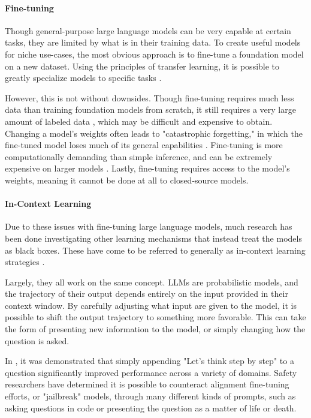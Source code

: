 \paragraph{Fine-tuning}

Though general-purpose large language models can be very capable at certain tasks, they are limited by what is in their training data. To create useful models for niche use-cases, the most obvious approach is to fine-tune a foundation model on a new dataset. Using the principles of transfer learning, it is possible to greatly specialize models to specific tasks \cite{dodge2020finetuningpretrainedlanguagemodels}.

However, this is not without downsides. Though fine-tuning requires much less data than training foundation models from scratch, it still requires a very large amount of labeled data \cite{vieira2024datadatafinetuninglarge}, which may be difficult and expensive to obtain. Changing a model's weights often leads to "catastrophic forgetting," in which the fine-tuned model loses much of its general capabilities \cite{catastrophic_forgetting}. Fine-tuning is more computationally demanding than simple inference, and can be extremely expensive on larger models \cite{hu2022lora}. Lastly, fine-tuning requires access to the model's weights, meaning it cannot be done at all to closed-source models.

\paragraph{In-Context Learning}

Due to these issues with fine-tuning large language models, much research has been done investigating other learning mechanisms that instead treat the models as black boxes. These have come to be referred to generally as in-context learning strategies \citep{dong-etal-2024-survey}.

Largely, they all work on the same concept. LLMs are probabilistic models, and the trajectory of their output depends entirely on the input provided in their context window. By carefully adjusting what input are given to the model, it is possible to shift the output trajectory to something more favorable. This can take the form of presenting new information to the model, or simply changing how the question is asked.

In \citet{ZeroShot}, it was demonstrated that simply appending "Let's think step by step" to a question significantly improved performance across a variety of domains. Safety researchers have determined it is possible to counteract alignment fine-tuning efforts, or "jailbreak" models, through many different kinds of prompts, such as asking questions in code or presenting the question as a matter of life or death.

